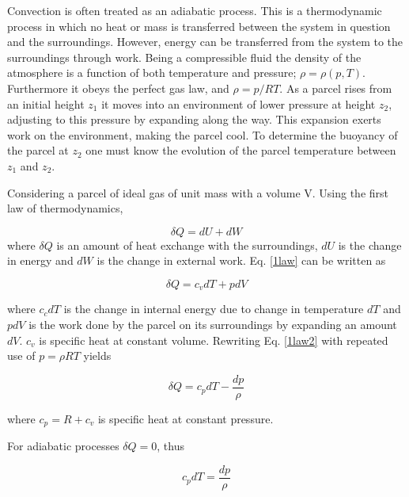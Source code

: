 

Convection is often treated as an adiabatic process. This is a thermodynamic process in which no heat or mass is transferred between the system in question and the surroundings. However, energy can be transferred from the system to the surroundings through work. Being a compressible fluid the density of the atmosphere is a function of both temperature and pressure; $\rho = \rho(p,T)$. Furthermore it obeys the perfect gas law, and $\rho = p/RT$. As a parcel rises from an initial height $z_1$ it moves into an environment of lower pressure at height $z_2$, adjusting to this pressure by expanding along the way. This expansion exerts work on the environment, making the parcel cool. To determine the buoyancy of the parcel at $z_2$ one must know the evolution of the parcel temperature between $z_1$ and $z_2$.

Considering a parcel of ideal gas of unit mass with a volume V. Using the first law of thermodynamics,

\begin{equation}
    \delta Q = dU + dW
    \label{1law}
\end{equation}
where $\delta Q$ is an amount of heat exchange with the surroundings, $dU$ is the change in energy and $dW$ is the change in external work. Eq. \eqref{1law} can be written as 

\begin{equation}
    \delta Q = c_vdT + pdV
    \label{1law2}
\end{equation}

where $c_cdT$ is the change in internal energy due to change in temperature $dT$ and $pdV$ is the work done by the parcel on its surroundings by expanding an amount $dV$. $c_v$ is specific heat at constant volume. Rewriting Eq. \eqref{1law2} with repeated use of $p=\rho RT$ yields 

\begin{equation}
    \delta Q = c_pdT - \frac{dp}{\rho}
    \label{thermo1}
\end{equation}

where $c_p = R + c_v$ is specific heat at constant pressure. 

For adiabatic processes $\delta Q = 0$, thus

\begin{equation}
    c_pdT = \frac{dp}{\rho}
    \label{dq0}
\end{equation}

